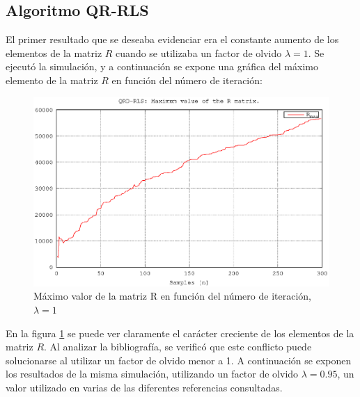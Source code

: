 \subsection{Algoritmo QR-RLS}

El primer resultado que se deseaba evidenciar era el constante aumento de los elementos de la matriz $R$ cuando se utilizaba un factor de olvido $\lambda = 1$. Se ejecutó la simulación, y a continuación se expone una gráfica del máximo elemento de la matriz $R$ en función del número de iteración:

\newpage

\begin{figure}[!hbt]
  \begin{center}
    \includegraphics[width=12 cm]{./figures/C05-qrd_rls_max_r_value_lambda_1}
    \caption{Máximo valor de la matriz R en función del número de iteración, $\lambda = 1$}
    \label{fig:qrd_rls_max_r_value_lambda_1}
  \end{center}
\end{figure}

En la figura \ref{fig:qrd_rls_max_r_value_lambda_1} se puede ver claramente el carácter creciente de los elementos de la matriz $R$. Al analizar la bibliografía, se verificó que este conflicto puede solucionarse al utilizar un factor de olvido menor a 1. A continuación se exponen los resultados de la misma simulación, utilizando un factor de olvido $\lambda = 0.95$, un valor utilizado en varias de las diferentes referencias consultadas.

